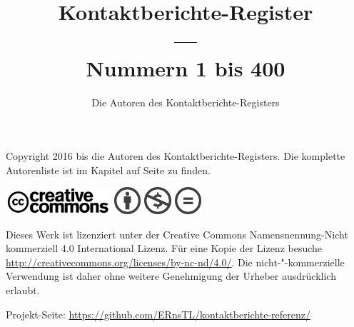 \documentclass[ngerman,10pt]{book}
\title{Kontaktberichte-Register \\ --- \\ \Large{Nummern 1 bis 400}}
\author{Die Autoren des Kontaktberichte-Registers}
\date{}%
\begin{document}
\frontmatter



\maketitle




\thispagestyle{empty}
\null    %
\vfill

\noindent Copyright {\textcopyright} 2016 bis {\the\year} die Autoren des Kontaktberichte-Registers. Die komplette Autorenliste ist im Kapitel \emph{} auf Seite \pageref{ch:mitwirkende} zu finden.%

\vspace{2mm}

\includegraphics[height=10mm,keepaspectratio=true]{CreativeCommons_logo_trademark}
\includegraphics[height=10mm,keepaspectratio=true]{chooser_by} \includegraphics[height=10mm,keepaspectratio=true]{chooser_nc} \includegraphics[height=10mm,keepaspectratio=true]{chooser_nd}

\vspace{2mm}

\noindent Dieses Werk ist lizenziert unter der Creative Commons Namensnennung-Nicht kommerziell 4.0 International Lizenz. Für eine Kopie der Lizenz besuche \url{http://creativecommons.org/licenses/by-nc-nd/4.0/}. Die nicht-"-kommerzielle Verwendung ist daher ohne weitere Genehmigung der Urheber ausdrücklich erlaubt.

\vspace{2mm}

\noindent Projekt-Seite: \url{https://github.com/ERnsTL/kontaktberichte-referenz/}

\vspace{2mm}
\end{document}
